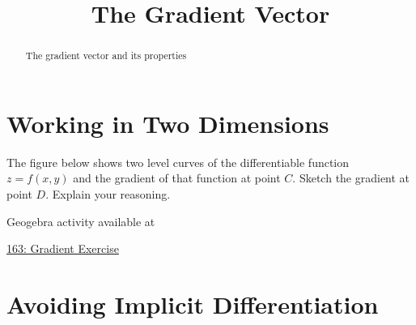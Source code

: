 \documentclass{ximera}
\title{The Gradient Vector}
\begin{document}
\begin{abstract}
The gradient vector and its properties
\end{abstract}
\maketitle

\section{Working in Two Dimensions}


\begin{question}  \label{Qdr4356}
The figure below shows two level curves of the differentiable function $z=f(x,y)$ and the gradient of that function at point $C$. Sketch the gradient at point $D$. Explain your reasoning.

 
\begin{onlineOnly}
    \begin{center}
\end{center}
\end{onlineOnly}

Geogebra activity available at

\href{https://www.geogebra.org/classic/zau4grcm}{163: Gradient Exercise}


\end{question}


\section{Avoiding Implicit Differentiation}
\end{document}
